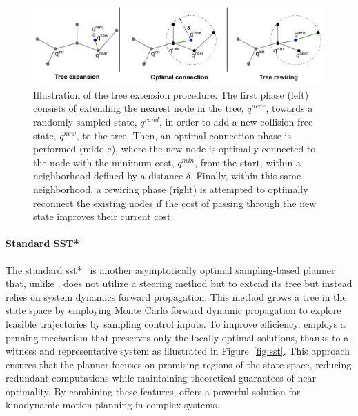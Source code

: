 \begin{figure} [h]
    \centering
    \includegraphics[width=0.95\linewidth]{figures/samp/rrtstar.png} 
    \caption{Illustration of the  tree extension procedure.
    The first phase (left) consists of extending the nearest node in the tree, $q^{near}$, towards a randomly sampled state, $q^{rand}$, in order to add a new collision-free state, $q^{new}$, to the tree.
    Then, an optimal connection phase is performed (middle), where the new node is optimally connected to the node with the minimum cost, $q^{min}$, from the start, within a neighborhood defined by a distance $\delta$.
    Finally, within this same neighborhood, a rewiring phase (right) is attempted to optimally reconnect the existing nodes if the cost of passing through the new state improves their current cost.}%
    \label{fig:rrtstar}%
\end{figure}

\paragraph{Standard SST*}

The standard \gls{sst*}~\cite{cSST} is another asymptotically optimal sampling-based planner that, unlike , does not utilize a steering method but to extend its tree but instead relies on system dynamics forward propagation.
This method grows a tree in the state space by employing Monte Carlo forward dynamic propagation to explore feasible trajectories by sampling control inputs.
To improve efficiency,  employs a pruning mechanism that preserves only the locally optimal solutions, thanks to a witness and representative system as illustrated in Figure~\ref{fig:sst}.
This approach ensures that the planner focuses on promising regions of the state space, reducing redundant computations while maintaining theoretical guarantees of near-optimality. 
By combining these features,  offers a powerful solution for kinodynamic motion planning in complex systems.

